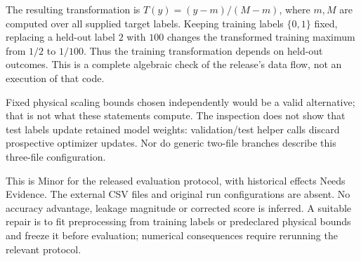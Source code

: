\documentclass[10pt]{article}
\begin{document}
The resulting transformation is \(T(y)=(y-m)/(M-m)\), where \(m,M\) are computed over all supplied target labels. Keeping training labels \(\{0,1\}\) fixed, replacing a held-out label \(2\) with \(100\) changes the transformed training maximum from \(1/2\) to \(1/100\). Thus the training transformation depends on held-out outcomes. This is a complete algebraic check of the release’s data flow, not an execution of that code.\par
Fixed physical scaling bounds chosen independently would be a valid alternative; that is not what these statements compute. The inspection does not show that test labels update retained model weights: validation/test helper calls discard prospective optimizer updates. Nor do generic two-file branches describe this three-file configuration.\par
This is Minor for the released evaluation protocol, with historical effects Needs Evidence. The external CSV files and original run configurations are absent. No accuracy advantage, leakage magnitude or corrected score is inferred. A suitable repair is to fit preprocessing from training labels or predeclared physical bounds and freeze it before evaluation; numerical consequences require rerunning the relevant protocol.\par
\end{document}
